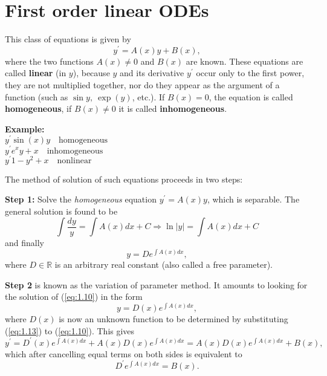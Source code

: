 \documentclass[11pt,a4paper,twoside]{article}
\begin{document}
	\section{First order linear ODEs}
	This class of equations is given by
	\begin{equation}\label{eq:1.10}
		y^\prime = A(x) y + B(x),
	\end{equation}
	where the two functions $A(x) \ne 0$ and $B(x)$ are known. These equations are called \textbf{linear} (in $y$), because $y$ and its derivative $y^\prime$ occur only to the first power, they are not multiplied together, nor do they appear as the argument of a function (such as $\sin y,\ \exp(y)$, etc.). If $B(x) = 0$, the equation is called \textbf{homogeneous}, if $B(x) \ne 0$ it is called \textbf{inhomogeneous}.\par
	\textbf{Example:}\\
	$y^\prime \sin(x)y \quad \text{homogeneous}$\\
	$y^\prime e^xy + x \quad \text{inhomogeneous}$\\
	$y^\prime 1 - y^2 + x \quad \text{nonlinear}$\par
	The method of solution of such equations proceeds in two steps:\par
	\textbf{Step 1:} Solve the \textit{homogeneous} equation $y^\prime = A(x)y$, which is separable. The general solution is found to be
	\begin{equation}\label{eq:1.11}
		\int \frac{dy}{y} = \int A(x)dx + C \Rightarrow \ln|y| = \int A(x)dx + C
	\end{equation}
	and finally
	\begin{equation}\label{eq:1.12}
		y = De^{\int A(x)dx},
	\end{equation}
	where $D \in \mathbb{R}$ is an arbitrary real constant (also called a free parameter).\par
	\textbf{Step 2} is known as the variation of parameter method. It amounts to looking for the solution of (\ref{eq:1.10}) in the form
	\begin{equation}\label{eq:1.13}
		y = D(x)e^{\int A(x)dx},
	\end{equation}
	where $D(x)$ is now an unknown function to be determined by substituting (\ref{eq:1.13}) to (\ref{eq:1.10}). This gives
	$$
	y^\prime
	= D^\prime(x)e^{\int A(x)dx} + A(x)D(x)e^{\int A(x)dx}
	= A(x)D(x)e^{\int A(x)dx} + B(x),
	$$
	which after cancelling equal terms on both sides is equivalent to
	\begin{equation}\label{eq:1.14}
		D^\prime e^{\int A(x)dx} = B(x).
	\end{equation}
\end{document}
